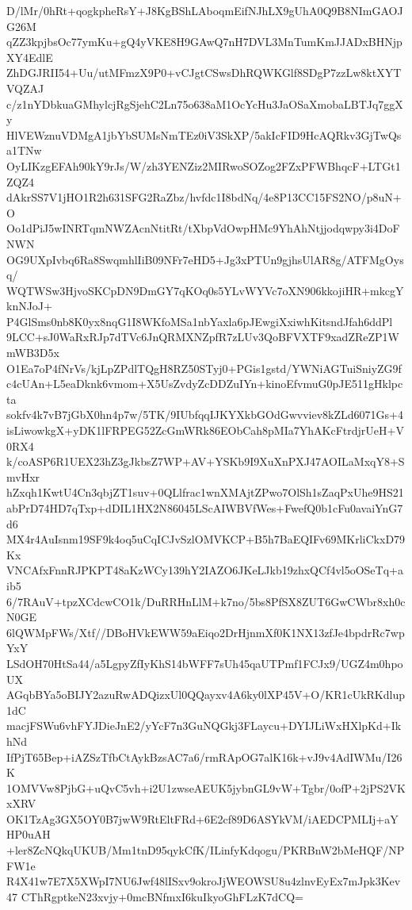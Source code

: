 D/lMr/0hRt+qogkpheRsY+J8KgBShLAboqmEifNJhLX9gUhA0Q9B8NImGAOJG26M
qZZ3kpjbsOc77ymKu+gQ4yVKE8H9GAwQ7nH7DVL3MnTumKmJJADxBHNjpXY4EdlE
ZhDGJRII54+Uu/utMFmzX9P0+vCJgtCSwsDhRQWKGlf8SDgP7zzLw8ktXYTVQZAJ
c/z1nYDbkuaGMhylcjRgSjehC2Ln75o638aM1OcYcHu3JaOSaXmobaLBTJq7ggXy
HlVEWznuVDMgA1jbYbSUMsNmTEz0iV3SkXP/5akIcFID9HcAQRkv3GjTwQsa1TNw
OyLIKzgEFAh90kY9rJs/W/zh3YENZiz2MIRwoSOZog2FZxPFWBhqcF+LTGt1ZQZ4
dAkrSS7V1jHO1R2h631SFG2RaZbz/hvfdc1I8bdNq/4e8P13CC15FS2NO/p8uN+O
Oo1dPiJ5wINRTqmNWZAcnNtitRt/tXbpVdOwpHMc9YhAhNtjjodqwpy3i4DoFNWN
OG9UXpIvbq6Ra8SwqmhlIiB09NFr7eHD5+Jg3xPTUn9gjhsUlAR8g/ATFMgOysq/
WQTWSw3HjvoSKCpDN9DmGY7qKOq0s5YLvWYVc7oXN906kkojiHR+mkcgYknNJoJ+
P4GlSms0nb8K0yx8nqG1I8WKfoMSa1nbYaxla6pJEwgiXxiwhKitsndJfah6ddPl
9LCC+sJ0WaRxRJp7dTVc6JnQRMXNZpfR7zLUv3QoBFVXTF9xadZReZP1WmWB3D5x
O1Ea7oP4fNrVs/kjLpZPdlTQgH8RZ50STyj0+PGis1gstd/YWNiAGTuiSniyZG9f
c4cUAn+L5eaDknk6vmom+X5UsZvdyZcDDZuIYn+kinoEfvmuG0pJE511gHklpcta
sokfv4k7vB7jGbX0hn4p7w/5TK/9IUbfqqIJKYXkbGOdGwvviev8kZLd6071Gs+4
isLiwowkgX+yDK1lFRPEG52ZcGmWRk86EObCah8pMIa7YhAKcFtrdjrUeH+V0RX4
k/coASP6R1UEX23hZ3gJkbsZ7WP+AV+YSKb9I9XuXnPXJ47AOILaMxqY8+SmvHxr
hZxqh1KwtU4Cn3qbjZT1suv+0QLlfrac1wnXMAjtZPwo7OlSh1sZaqPxUhe9HS21
abPrD74HD7qTxp+dDIL1HX2N86045LScAIWBVfWes+FwefQ0b1cFu0avaiYnG7d6
MX4r4AuIsnm19SF9k4oq5uCqICJvSzlOMVKCP+B5h7BaEQIFv69MKrliCkxD79Kx
VNCAfxFnnRJPKPT48aKzWCy139hY2IAZO6JKeLJkb19zhxQCf4vl5oOSeTq+aib5
6/7RAuV+tpzXCdcwCO1k/DuRRHnLlM+k7no/5bs8PfSX8ZUT6GwCWbr8xh0cN0GE
6lQWMpFWs/Xtf//DBoHVkEWW59aEiqo2DrHjnmXf0K1NX13zfJe4bpdrRc7wpYxY
LSdOH70HtSa44/a5LgpyZfIyKhS14bWFF7sUh45qaUTPmf1FCJx9/UGZ4m0hpoUX
AGqbBYa5oBIJY2azuRwADQizxUl0QQayxv4A6ky0lXP45V+O/KR1cUkRKdlup1dC
macjFSWu6vhFYJDieJnE2/yYcF7n3GuNQGkj3FLaycu+DYIJLiWxHXlpKd+IkhNd
IfPjT65Bep+iAZSzTfbCtAykBzsAC7a6/rmRApOG7alK16k+vJ9v4AdIWMu/I26K
1OMVVw8PjbG+uQvC5vh+i2U1zwseAEUK5jybnGL9vW+Tgbr/0ofP+2jPS2VKxXRV
OK1TzAg3GX5OY0B7jwW9RtEltFRd+6E2cf89D6ASYkVM/iAEDCPMLIj+aYHP0uAH
+ler8ZcNQkqUKUB/Mm1tnD95qykCfK/ILinfyKdqogu/PKRBnW2bMeHQF/NPFW1e
R4X41w7E7X5XWpI7NU6Jwf48lISxv9okroJjWEOWSU8u4zlnvEyEx7mJpk3Kev47
CThRgptkeN23xvjy+0mcBNfmxI6kuIkyoGhFLzK7dCQ=
